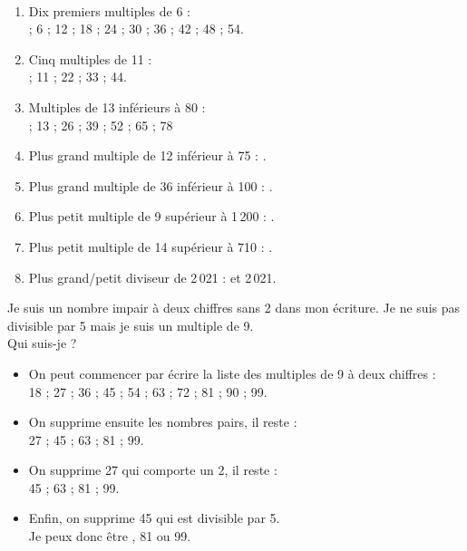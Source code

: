\begin{colonne*exercice}
\begin{corrige}
   \ \\ [-5mm]\begin{enumerate}
      \item Dix premiers multiples de 6 : \\
         { ; 6 ; 12 ; 18 ; 24 ; 30 ; 36 ; 42 ; 48 ; 54}.
      \item Cinq multiples de 11 : \\
         { ; 11 ; 22 ; 33 ; 44}.
      \item Multiples de 13 inférieurs à 80 : \\
         { ; 13 ; 26 ; 39 ; 52 ; 65 ; 78}
      \item Plus grand multiple de 12 inférieur à 75 : {}.
      \item Plus grand multiple de 36 inférieur à 100 : {}.
      \item Plus petit multiple de 9 supérieur à 1\,200 : {}.
      \item Plus petit multiple de 14 supérieur à 710 : {}.
      \item Plus grand/petit diviseur de 2\,021 : { et 2\,021}.
   \end{enumerate}
\end{corrige}

\bigskip


\begin{exercice} %
   Je suis un nombre impair à deux chiffres sans 2 dans mon écriture. Je ne suis pas divisible par 5 mais je suis un multiple de 9. \\
   Qui suis-je ? 
\end{exercice}

\begin{corrige}
   \begin{itemize}
      \item On peut commencer par écrire la liste des multiples de 9 à deux chiffres : \\
         18 ; 27 ; 36 ; 45 ; 54 ; 63 ; 72 ; 81 ; 90 ; 99.
      \item On supprime ensuite les nombres pairs, il reste : \\
         27 ; 45 ; 63 ; 81 ; 99.
      \item On supprime 27 qui comporte un 2, il reste : \\
         45 ; 63 ; 81 ; 99. \\
      \item Enfin, on supprime 45 qui est divisible par 5. \\
         Je peux donc être {, 81 ou 99}.
   \end{itemize}
\end{corrige}


\end{colonne*exercice}
